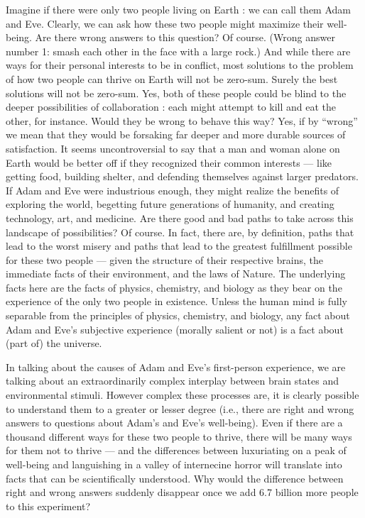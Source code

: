 \documentclass[a4paper,14pt]{extbook}
\begin{document}
Imagine if there were only two people living on Earth :
we can call them Adam and Eve.
Clearly, we can ask how these two people might maximize their well-being.
Are there wrong answers to this question?
Of course.
(Wrong answer number 1: smash each other in the face with a large rock.)
And while there are ways for their personal interests to be in conflict, most solutions to the problem of how two people can thrive on Earth will not be zero-sum.
Surely the best solutions will not be zero-sum.
Yes, both of these people could be blind to the deeper possibilities of collaboration :
each might attempt to kill and eat the other, for instance.
Would they be wrong to behave this way?
Yes, if by ``wrong'' we mean that they would be forsaking far deeper and more durable sources of satisfaction.
It seems uncontroversial to say that a man and woman alone on Earth would be better off if they recognized their common interests --- like getting food, building shelter, and defending themselves against larger predators.
If Adam and Eve were industrious enough, they might realize the benefits of exploring the world, begetting future generations of humanity, and creating technology, art, and medicine.
Are there good and bad paths to take across this landscape of possibilities?
Of course. In fact, there are, by definition, paths that lead to the worst misery and paths that lead to the greatest fulfillment possible for these two people --- given the structure of their respective brains, the immediate facts of their environment, and the laws of Nature.
The underlying facts here are the facts of physics, chemistry, and biology as they bear on the experience of the only two people in existence.
Unless the human mind is fully separable from the principles of physics, chemistry, and biology, any fact about Adam and Eve's subjective experience (morally salient or not) is a fact about (part of) the universe.

In talking about the causes of Adam and Eve's first-person experience, we are talking about an extraordinarily complex interplay between brain states and environmental stimuli.
However complex these processes are, it is clearly possible to understand them to a greater or lesser degree (i.e., there are right and wrong answers to questions about Adam's and Eve's well-being).
Even if there are a thousand different ways for these two people to thrive, there will be many ways for them not to thrive --- and the differences between luxuriating on a peak of well-being and languishing in a valley of internecine horror will translate into facts that can be scientifically understood.
Why would the difference between right and wrong answers suddenly disappear once we add 6.7 billion more people to this experiment?
\end{document}
